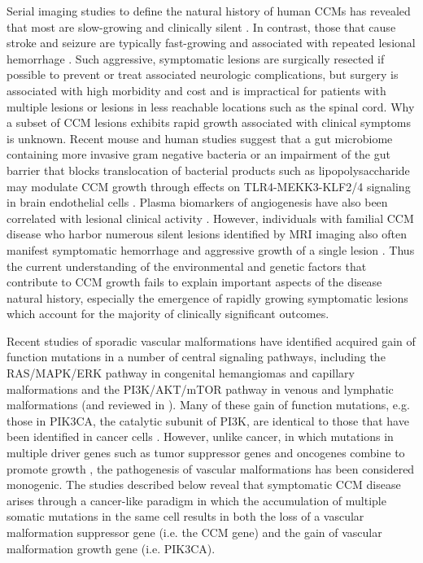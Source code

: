 Serial imaging studies to define the natural history of human CCMs has revealed that most are slow-growing and clinically silent \citep{akers2017, alshanisalman2012, horne2016}. In contrast, those that cause stroke and seizure are typically fast-growing and associated with repeated lesional hemorrhage \citep{awad2019, porter1997}. Such aggressive, symptomatic lesions are surgically resected if possible to prevent or treat associated neurologic complications, but surgery is associated with high morbidity and cost and is impractical for patients with multiple lesions or lesions in less reachable locations such as the spinal cord. Why a subset of CCM lesions exhibits rapid growth associated with clinical symptoms is unknown. Recent mouse and human studies suggest that a gut microbiome containing more invasive gram negative bacteria or an impairment of the gut barrier that blocks translocation of bacterial products such as lipopolysaccharide may modulate CCM growth through effects on TLR4-MEKK3-KLF2/4 signaling in brain endothelial cells \citep{tang2019, tang2017, polster2020}. Plasma biomarkers of angiogenesis have also been correlated with lesional clinical activity \citep{girard2018, lyne2019}. However, individuals with familial CCM disease who harbor numerous silent lesions identified by MRI imaging also often manifest symptomatic hemorrhage and aggressive growth of a single lesion \citep{polster2019}. Thus the current understanding of the environmental and genetic factors that contribute to CCM growth fails to explain important aspects of the disease natural history, especially the emergence of rapidly growing symptomatic lesions which account for the majority of clinically significant outcomes.

Recent studies of sporadic vascular malformations have identified acquired gain of function mutations in a number of central signaling pathways, including the RAS/MAPK/ERK pathway in congenital hemangiomas and capillary malformations and the PI3K/AKT/mTOR pathway in venous and lymphatic malformations \citep{tenbroek2019, rodriguezlaguna2019, castillo2019, wetzelstrong2017, luks2015, limaye2015} (and reviewed in \citep{queisser2018}). Many of these gain of function mutations, e.g. those in PIK3CA, the catalytic subunit of PI3K, are identical to those that have been identified in cancer cells \citep{dastillo2016, castel2016, limaye2015, koren2015, samuels2005}. However, unlike cancer, in which mutations in multiple driver genes such as tumor suppressor genes and oncogenes combine to promote growth \citep{bailey2018, mcgranahan2015}, the pathogenesis of vascular malformations has been considered monogenic. The studies described below reveal that symptomatic CCM disease arises through a cancer-like paradigm in which the accumulation of multiple somatic mutations in the same cell results in both the loss of a vascular malformation suppressor gene (i.e. the CCM gene) and the gain of vascular malformation growth gene (i.e. PIK3CA). 
	
